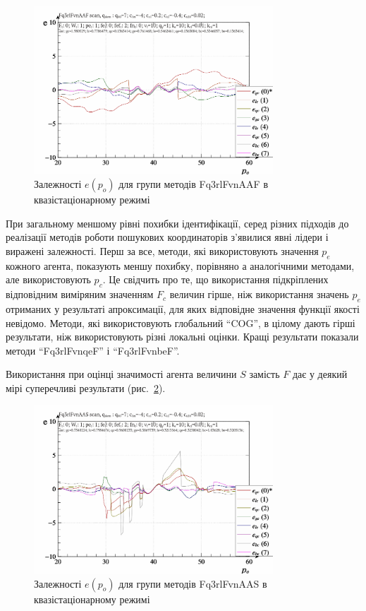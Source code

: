 \begin{figure}[htb!]
  \begin{center}
    \includegraphics[width=0.8\textwidth]{p/scan/qls-p_p_e_Fq3rlFvnAAF_scan.png}
  \end{center}
  \caption{Залежності $e(p_o)$ для групи методів Fq3rlFvnAAF в квазістаціонарному режимі}
  \label{atu:f:Fq3rlFvnAAF_scan}
\end{figure}

При загальному меншому рівні похибки ідентифікації, серед
різних підходів до реалізації методів роботи пошукових
координаторів з'явилися явні лідери і виражені залежності. Перш
за все, методи, які використовують значення
$ p_e $ кожного агента, показують меншу похибку, порівняно а
аналогічними методами, але використовують
$ p_c $. Це свідчить про те, що використання підкріплених
відповідним виміряним значенням
$ F_c $ величин гірше, ніж використання значень
$ p_e $ отриманих у результаті апроксимації, для яких відповідне значення функції якості
невідомо. Методи, які використовують глобальний ``COG'', в цілому
дають гірші результати, ніж використовують різні локальні
оцінки. Кращі результати показали методи ``Fq3rlFvnqeF'' і ``Fq3rlFvnbeF''.

Використання при оцінці значимості агента величини
$ S $ замість
$ F $ дає у деякий мірі суперечливі результати (рис.~\ref{atu:f:Fq3rlFvnAAS_scan}).

\begin{figure}[htb!]
  \begin{center}
    \includegraphics[width=0.8\textwidth]{p/scan/qls-p_p_e_Fq3rlFvnAAS_scan.png}
  \end{center}
  \caption{Залежності $e(p_o)$ для групи методів Fq3rlFvnAAS в квазістаціонарному режимі}
  \label{atu:f:Fq3rlFvnAAS_scan}
\end{figure}

